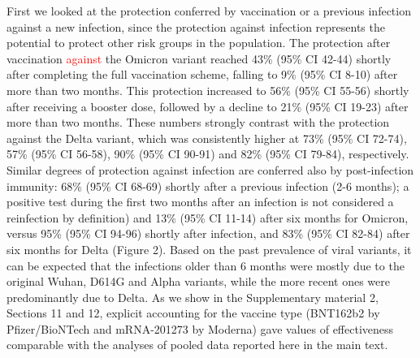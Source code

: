 \documentclass[a4paper,12pt]{article}
\def\figIalone{2}
\newcommand{\new}[1]{\textcolor{red}{#1}}
\begin{document}
First we looked at the protection conferred by vaccination or a previous infection against a new infection, since the protection against infection represents the potential to protect other risk groups in the population. The protection after vaccination \new{against} the Omicron variant reached 43\% (95\% CI 42-44) shortly after completing the full vaccination scheme, falling to 9\% (95\% CI 8-10) after more than two months. This protection increased to 56\% (95\% CI 55-56) shortly after receiving a booster dose, followed by a decline to 21\% (95\% CI 19-23) after more than two months. These numbers strongly contrast with the protection against the Delta variant, which was consistently higher at 73\% (95\% CI 72-74), 57\% (95\% CI 56-58), 90\% (95\% CI 90-91) and 82\% (95\% CI 79-84), respectively. Similar degrees of protection against infection are conferred also by post-infection immunity: 68\% (95\% CI 68-69) shortly after a previous infection (2-6 months); a positive test during the first two months after an infection is not considered a reinfection by definition) and 13\% (95\% CI 11-14) after six months for Omicron, versus 95\% (95\% CI 94-96) shortly after infection, and 83\% (95\% CI 82-84) after six months for Delta (Figure \figIalone). Based on the past prevalence of viral variants, it can be expected that the infections older than 6 months were mostly due to the original Wuhan, D614G and Alpha variants, while the more recent ones were predominantly due to Delta. As we show in the Supplementary material 2, Sections 11 and 12, explicit accounting for the vaccine type (BNT162b2 by Pfizer/BioNTech and mRNA-201273 by Moderna) gave values of effectiveness comparable with the analyses of pooled data reported here in the main text.   
\end{document}
